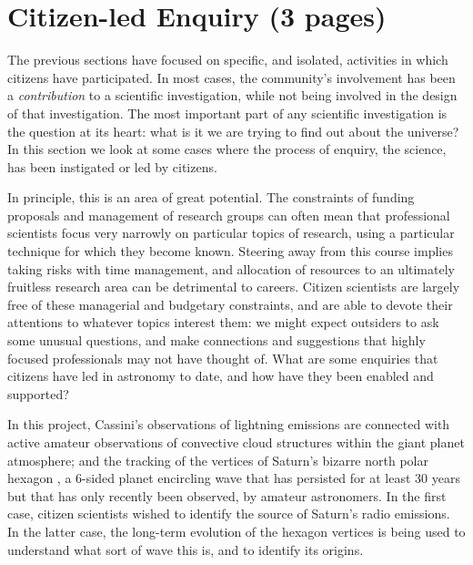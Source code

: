 \documentclass{ar2e}
\begin{document}

\section{Citizen-led Enquiry (3 pages)}
\label{sec:explore}

The previous sections have focused on specific, and isolated, activities in
which citizens have participated. In most cases, the community's involvement has
been a {\it contribution} to a scientific investigation, while not being
involved in the design of that investigation. The most important part of any
scientific investigation is the question at its heart: what is it we are trying
to find out about the universe? In this section we look at some cases where the
process of enquiry, the science, has been instigated or led by citizens.  

In principle, this is an area of great potential. The constraints of funding
proposals and management of research groups can often mean that professional
scientists focus very narrowly on particular topics of research, using a
particular technique for which they become known.  Steering away from this
course implies taking risks with time management, and allocation of resources to
an ultimately fruitless research area can be detrimental to careers.  Citizen
scientists are largely free of these managerial and budgetary constraints, and
are able to devote their attentions to whatever topics interest them: we might
expect outsiders to ask some unusual questions, and make connections and
suggestions that highly focused professionals may not have thought of. What are
some enquiries that citizens have led in astronomy to date, and how have they
been enabled and supported?


In this project, Cassini's observations of lightning emissions are connected
with active amateur observations of convective cloud structures within the giant
planet atmosphere; and the tracking of the vertices of Saturn's bizarre north
polar hexagon \citep{88godfrey}, a 6-sided planet encircling wave that has
persisted for at least 30 years but that has only recently been observed, by
amateur astronomers.  In the first case, citizen scientists wished to identify
the source of Saturn's radio emissions.  In the latter case, the long-term
evolution of the hexagon vertices is being used to understand what sort of wave
this is, and to identify its origins.
\end{document}
